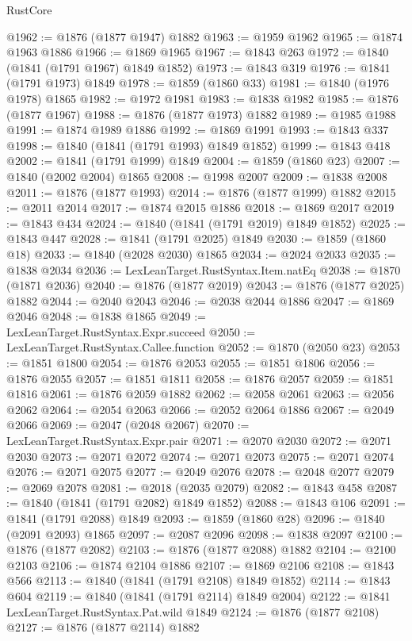 \begin{lexlean}{RustCore}
\begin{coremodule}
@1962 := @1876 (@1877 @1947) @1882
@1963 := @1959 @1962
@1965 := @1874 @1963 @1886
@1966 := @1869 @1965
@1967 := @1843 @263
@1972 := @1840 (@1841 (@1791 @1967) @1849 @1852)
@1973 := @1843 @319
@1976 := @1841 (@1791 @1973) @1849
@1978 := @1859 (@1860 @33)
@1981 := @1840 (@1976 @1978) @1865
@1982 := @1972 @1981
@1983 := @1838 @1982
@1985 := @1876 (@1877 @1967)
@1988 := @1876 (@1877 @1973) @1882
@1989 := @1985 @1988
@1991 := @1874 @1989 @1886
@1992 := @1869 @1991
@1993 := @1843 @337
@1998 := @1840 (@1841 (@1791 @1993) @1849 @1852)
@1999 := @1843 @418
@2002 := @1841 (@1791 @1999) @1849
@2004 := @1859 (@1860 @23)
@2007 := @1840 (@2002 @2004) @1865
@2008 := @1998 @2007
@2009 := @1838 @2008
@2011 := @1876 (@1877 @1993)
@2014 := @1876 (@1877 @1999) @1882
@2015 := @2011 @2014
@2017 := @1874 @2015 @1886
@2018 := @1869 @2017
@2019 := @1843 @434
@2024 := @1840 (@1841 (@1791 @2019) @1849 @1852)
@2025 := @1843 @447
@2028 := @1841 (@1791 @2025) @1849
@2030 := @1859 (@1860 @18)
@2033 := @1840 (@2028 @2030) @1865
@2034 := @2024 @2033
@2035 := @1838 @2034
@2036 := LexLeanTarget.RustSyntax.Item.natEq
@2038 := @1870 (@1871 @2036)
@2040 := @1876 (@1877 @2019)
@2043 := @1876 (@1877 @2025) @1882
@2044 := @2040 @2043
@2046 := @2038 @2044 @1886
@2047 := @1869 @2046
@2048 := @1838 @1865
@2049 := LexLeanTarget.RustSyntax.Expr.succeed
@2050 := LexLeanTarget.RustSyntax.Callee.function
@2052 := @1870 (@2050 @23)
@2053 := @1851 @1800
@2054 := @1876 @2053
@2055 := @1851 @1806
@2056 := @1876 @2055
@2057 := @1851 @1811
@2058 := @1876 @2057
@2059 := @1851 @1816
@2061 := @1876 @2059 @1882
@2062 := @2058 @2061
@2063 := @2056 @2062
@2064 := @2054 @2063
@2066 := @2052 @2064 @1886
@2067 := @2049 @2066
@2069 := @2047 (@2048 @2067)
@2070 := LexLeanTarget.RustSyntax.Expr.pair
@2071 := @2070 @2030
@2072 := @2071 @2030
@2073 := @2071 @2072
@2074 := @2071 @2073
@2075 := @2071 @2074
@2076 := @2071 @2075
@2077 := @2049 @2076
@2078 := @2048 @2077
@2079 := @2069 @2078
@2081 := @2018 (@2035 @2079)
@2082 := @1843 @458
@2087 := @1840 (@1841 (@1791 @2082) @1849 @1852)
@2088 := @1843 @106
@2091 := @1841 (@1791 @2088) @1849
@2093 := @1859 (@1860 @28)
@2096 := @1840 (@2091 @2093) @1865
@2097 := @2087 @2096
@2098 := @1838 @2097
@2100 := @1876 (@1877 @2082)
@2103 := @1876 (@1877 @2088) @1882
@2104 := @2100 @2103
@2106 := @1874 @2104 @1886
@2107 := @1869 @2106
@2108 := @1843 @566
@2113 := @1840 (@1841 (@1791 @2108) @1849 @1852)
@2114 := @1843 @604
@2119 := @1840 (@1841 (@1791 @2114) @1849 @2004)
@2122 := @1841 LexLeanTarget.RustSyntax.Pat.wild @1849
@2124 := @1876 (@1877 @2108)
@2127 := @1876 (@1877 @2114) @1882

\end{coremodule}
\end{lexlean}
